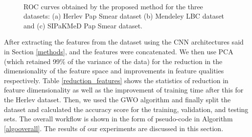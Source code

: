 \documentclass{llncs}
\begin{document}
\begin{figure*}
    \centering
    \\
    \caption{ROC curves obtained by the proposed method for the three datasets: (a) Herlev Pap Smear dataset (b) Mendeley LBC dataset and (c) SIPaKMeD Pap Smear dataset.}
    \label{roc}
\end{figure*}

After extracting the features from the dataset using the CNN architectures said in Section \ref{methods}, and the features were concatenated. We then use PCA (which retained 99\% of the variance of the data) for the reduction in the dimensionality of the feature space and improvements in feature qualities respectively. Table \ref{reduction_features} shows the statistics of reduction in feature dimensionality as well as the improvement of training time after this for the Herlev dataset. Then, we used the GWO algorithm and finally split the dataset and calculated the accuracy score for the training, validation, and testing sets. The overall workflow is shown in the form of pseudo-code in Algorithm \ref{algooverall}. The results of our experiments are discussed in this section.
\end{document}

